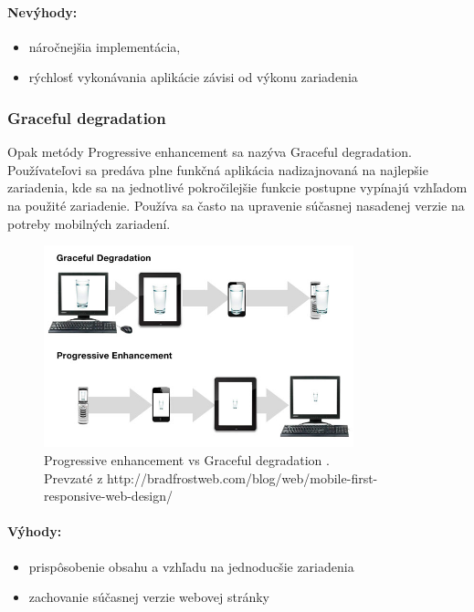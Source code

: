 \paragraph{Nevýhody:}
\begin{itemize}
	\item náročnejšia implementácia, 
	\item rýchlosť vykonávania aplikácie závisi od výkonu zariadenia
\end{itemize}


\subsubsection{Graceful degradation} %
\label{ssub:graceful_degradation}

Opak metódy Progressive enhancement sa nazýva Graceful degradation. Používateľovi sa predáva plne funkčná aplikácia nadizajnovaná na najlepšie zariadenia, kde sa na jednotlivé pokročilejšie funkcie postupne vypínajú vzhľadom na použité zariadenie. Používa sa často na upravenie súčasnej nasadenej verzie na potreby mobilných zariadení.

\begin{figure}[H]
	\centering
	\includegraphics[width=0.8\textwidth]{img/PEvsGD.jpg}
	\caption[Progressive enhancement vs Graceful degradation]{
		Progressive enhancement vs Graceful degradation \cite{adaptivesxsw}.\\
		Prevzaté z http://bradfrostweb.com/blog/web/mobile-first-responsive-web-design/}
	\label{fig: gd}
\end{figure}

\paragraph{Výhody:}
\begin{itemize}
	\item prispôsobenie obsahu a vzhľadu na jednoducšie zariadenia
	\item zachovanie súčasnej verzie webovej stránky
\end{itemize}


